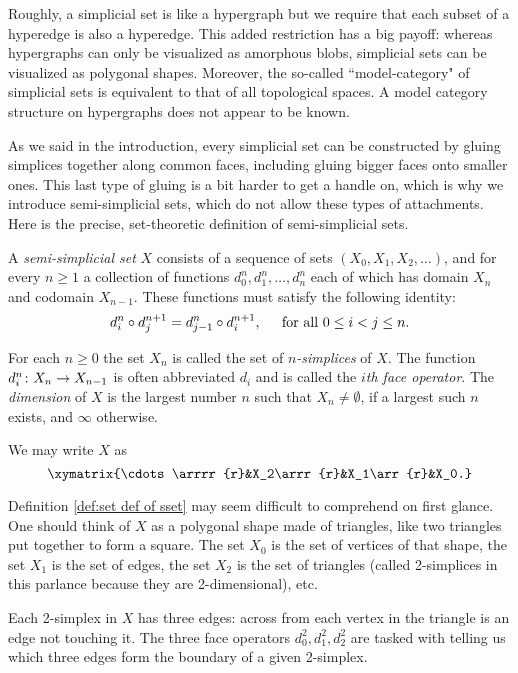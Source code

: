 \documentclass{amsart}
\begin{document}
Roughly, a simplicial set is like a hypergraph but we require that each subset of a hyperedge is also a hyperedge.  This added restriction has a big payoff: whereas hypergraphs can only be visualized as amorphous blobs, simplicial sets can be visualized as polygonal shapes.  Moreover, the so-called ``model-category" of simplicial sets is equivalent to that of all topological spaces.  A model category structure on hypergraphs does not appear to be known.

As we said in the introduction, every simplicial set can be constructed by gluing simplices together along common faces, including gluing bigger faces onto smaller ones.  This last type of gluing is a bit harder to get a handle on, which is why we introduce semi-simplicial sets, which do not allow these types of attachments.  Here is the precise, set-theoretic definition of semi-simplicial sets.

\begin{definition}\label{def:set def of sset}

A {\em semi-simplicial set} $X$ consists of a sequence of sets $(X_0,X_1,X_2,\ldots)$, and for every $n\geq 1$ a collection of functions $d^n_0,d^n_1,\ldots,d^n_n$ each of which has domain $X_n$ and codomain $X_{n-1}$.  These functions must satisfy the following identity: $$d^n_i\circ d^{n+1}_j=d^n_{j-1}\circ d^{n+1}_i, \hspace{.2in} \textnormal{for all } 0\leq i<j\leq n.$$  

For each $n\geq 0$ the set $X_n$ is called the set of {\em $n$-simplices} of $X$.  The function $d^n_i\colon X_n\rightarrow X_{n-1}$ is often abbreviated $d_i$ and is called the {\em $i$th face operator}.  The {\em dimension} of $X$ is the largest number $n$ such that $X_n\neq\emptyset$, if a largest such $n$ exists, and $\infty$ otherwise.


We may write $X$ as $$\xymatrix{\cdots \arrrr{r}&X_2\arrr{r}&X_1\arr{r}&X_0.}$$

\end{definition}

\begin{remark}

Definition \ref{def:set def of sset} may seem difficult to comprehend on first glance.  One should think of $X$ as a polygonal shape made of triangles, like two triangles put together to form a square.  The set $X_0$ is the set of vertices of that shape, the set $X_1$ is the set of edges, the set $X_2$ is the set of triangles (called 2-simplices in this parlance because they are 2-dimensional), etc.  

Each 2-simplex in $X$ has three edges: across from each vertex in the triangle is an edge not touching it.  The three face operators $d^2_0,d^2_1,d^2_2$ are tasked with telling us which three edges form the boundary of a given 2-simplex.

\end{remark}
\end{document}
